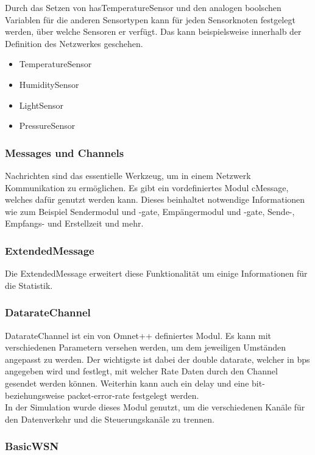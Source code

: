 Durch das Setzen von hasTemperatureSensor und den analogen boolschen Variablen für die anderen Sensortypen kann für jeden Sensorknoten festgelegt werden, über welche Sensoren er verfügt. Das kann beispielsweise innerhalb der Definition des Netzwerkes geschehen.

\begin{itemize}
\item TemperatureSensor
\item HumiditySensor
\item LightSensor
\item PressureSensor
\end{itemize}

\subsubsection{Messages und Channels}

Nachrichten sind das essentielle Werkzeug, um in einem Netzwerk Kommunikation zu ermöglichen. Es gibt ein vordefiniertes Modul cMessage, welches dafür genutzt werden kann. Dieses beinhaltet notwendige Informationen wie zum Beispiel Sendermodul und -gate, Empängermodul und -gate, Sende-, Empfangs- und Erstellzeit und mehr.

\subsubsection{ExtendedMessage}

Die ExtendedMessage erweitert diese Funktionalität um einige Informationen für die Statistik.

\subsubsection{DatarateChannel}

DatarateChannel ist ein von Omnet++ definiertes Modul. Es kann mit verschiedenen Parametern versehen werden, um dem jeweiligen Umständen angepasst zu werden. Der wichtigste ist dabei der double datarate, welcher in bps angegeben wird und festlegt, mit welcher Rate Daten durch den Channel gesendet werden können. Weiterhin kann auch ein delay und eine bit- beziehungsweise packet-error-rate festgelegt werden.\\
In der Simulation wurde dieses Modul genutzt, um die verschiedenen Kanäle für den Datenverkehr und die Steuerungskanäle zu trennen.

\subsubsection{BasicWSN}

